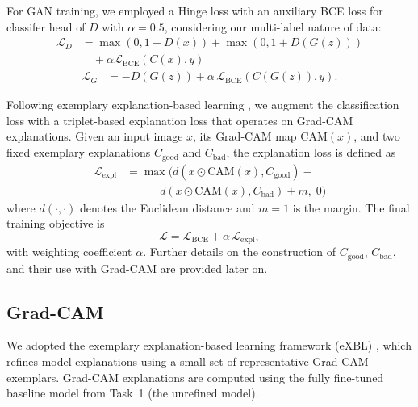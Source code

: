 \documentclass{article}
\begin{document}
For GAN training, we employed a Hinge loss \cite{Brock2018BigGAN, Miyato2018ProjectionDiscriminatorArXiv} with an auxiliary BCE loss for classifer head of $D$ with $\alpha=0.5$, considering our multi-label nature of data:
\begin{equation}
\begin{aligned}
\mathcal{L}_{D}
&=
\max(0, 1 - D(x))
+
\max(0, 1 + D(G(z)))
\\
&\quad +
\alpha\mathcal{L}_{\mathrm{BCE}}\!\left(C(x),y\right)
\end{aligned}
\end{equation}
\begin{equation}
\begin{aligned}
\mathcal{L}_{G}
&=
- D(G(z))
+
\alpha\,\mathcal{L}_{\mathrm{BCE}}\!\left(C(G(z)),y\right).
\end{aligned}
\end{equation}

Following exemplary explanation-based learning \cite{hagos2023learning}, we augment the classification loss with a triplet-based explanation loss that operates on Grad-CAM explanations. Given an input image $x$, its Grad-CAM map $\mathrm{CAM}(x)$, and two fixed exemplary explanations $C_{\text{good}}$ and $C_{\text{bad}}$, the explanation loss is defined as
\begin{equation}
\begin{aligned}
\mathcal{L}_{\text{expl}}
&=
\max\!\Big(
d(x \odot \mathrm{CAM}(x), C_{\text{good}})
-
\\
&\qquad\quad
d(x \odot \mathrm{CAM}(x), C_{\text{bad}}) + m,\; 0
\Big)
\end{aligned}
\end{equation}
where $d(\cdot,\cdot)$ denotes the Euclidean distance and $m=1$ is the margin. The final training objective is
\begin{equation}
\mathcal{L}
=
\mathcal{L}_{\mathrm{BCE}}
+
\alpha\,\mathcal{L}_{\text{expl}},
\end{equation}
with weighting coefficient $\alpha$. Further details on the construction of $C_{\text{good}}$, $C_{\text{bad}}$, and their use with Grad-CAM are provided later on.

\subsection{Grad-CAM}
We adopted the exemplary explanation-based learning framework (eXBL) \cite{hagos2023learning}, which refines model explanations using a small set of representative Grad-CAM exemplars. Grad-CAM explanations are computed using the fully fine-tuned baseline model from Task~1 (the unrefined model).
\end{document}
